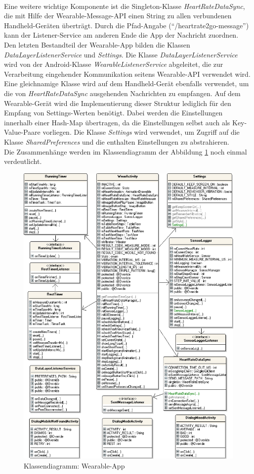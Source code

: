 \\[0.5cm]
Eine weitere wichtige Komponente ist die Singleton-Klasse \textit{HeartRateDataSync}, die mit Hilfe der Wearable-Message-API einen String zu allen verbundenen Handheld-Geräten überträgt. Durch die Pfad-Angabe ("`/heartrate2go-message"') kann der Listener-Service am anderen Ende die App der Nachricht zuordnen.
\\[0.5cm]
Den letzten Bestandteil der Wearable-App bilden die Klassen \textit{DataLayerListenerService} und \textit{Settings}. Die Klasse \textit{DataLayerListenerService} wird von der Android-Klasse \textit{WearableListenerService} abgeleitet, die zur Verarbeitung eingehender Kommunikation seitens Wearable-API verwendet wird. Eine gleichnamige Klasse wird auf dem Handheld-Gerät ebenfalls verwendet, um die von \textit{HeartRateDataSync} ausgehenden Nachrichten zu empfangen. Auf dem Wearable-Gerät wird die Implementierung dieser Struktur lediglich für den Empfang von Settings-Werten benötigt. Dabei werden die Einstellungen innerhalb einer Hash-Map übertragen, da die Einstellungen selbst auch als Key-Value-Paare vorliegen. Die Klasse \textit{Settings} wird verwendet, um Zugriff auf die Klasse \textit{SharedPreferences} und die enthalten Einstellungen zu abstrahieren.
\\[0.5cm]
Die Zusammenhänge werden im Klassendiagramm der Abbildung \ref{fig:classes_wearable} noch einmal verdeutlicht.
\bigskip
\begin{figure}[H]
	\centering
	\includegraphics[scale=0.7]{images/classes_wearable.png}
	\caption{Klassendiagramm: Wearable-App}
	\label{fig:classes_wearable}
\end{figure}
\bigskip

